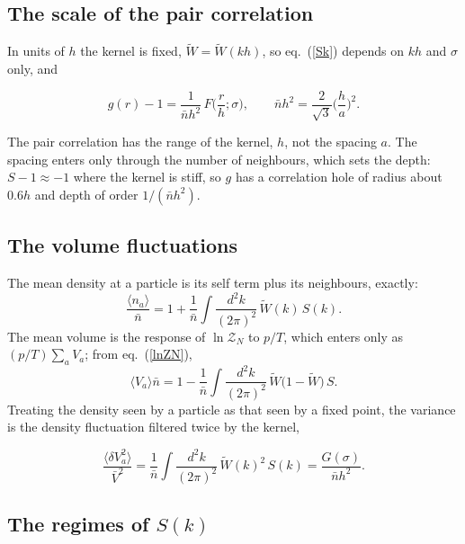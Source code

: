 \documentclass[11pt,aps,preprint,nofootinbib,superscriptaddress,tightenlines]{revtex4-2}
\newcommand{\avg}[1]{\langle #1\rangle}
\def\st{\begin{equation}}
\def\stp{\end{equation}}
\def\Eq#1{eq.~(\ref{#1})}
\begin{document}
\subsection{The scale of the pair correlation}
\label{sec:scale}

In units of $h$ the kernel is fixed, $\widetilde W=\widetilde W(kh)$, so \Eq{Sk} depends on $kh$ and $\sigma$ only, and
\begin{keyeq}
\st
g(r)-1=\frac1{\bar nh^2}\,F\Big(\frac rh;\sigma\Big),\qquad \bar nh^2=\frac2{\sqrt3}\Big(\frac ha\Big)^2 .
\label{scaling}
\stp
\end{keyeq}
The pair correlation has the range of the kernel, $h$, not the spacing $a$.  The spacing enters only through the number of neighbours, which sets the depth:
$S-1\approx-1$ where the kernel is stiff, so $g$ has a correlation hole of radius about $0.6h$ and depth of order $1/(\bar nh^2)$.

\subsection{The volume fluctuations}
\label{sec:Vfluct}

The mean density at a particle is its self term plus its neighbours, exactly:
\st
\frac{\avg{n_a}}{\bar n}=1+\frac1{\bar n}\int\frac{d^2k}{(2\pi)^2}\,\widetilde W(k)\,S(k) .
\stp
The mean volume is the response of $\ln\mathcal Z_N$ to $p/T$, which enters only as $(p/T)\sum_aV_a$; from \Eq{lnZN},
\st
\avg{V_a}\bar n=1-\frac1{\bar n}\int\frac{d^2k}{(2\pi)^2}\,\widetilde W\big(1-\widetilde W\big)\,S .
\stp
Treating the density seen by a particle as that seen by a fixed point, the variance is the density fluctuation filtered twice by the kernel,
\begin{keyeq}
\st
\frac{\avg{\delta V_a^2}}{\bar V^2}=\frac1{\bar n}\int\frac{d^2k}{(2\pi)^2}\,\widetilde W(k)^2\,S(k)=\frac{G(\sigma)}{\bar nh^2} .
\label{Vvar}
\stp
\end{keyeq}

\subsection{The regimes of $S(k)$}
\label{sec:regimes}
\end{document}
